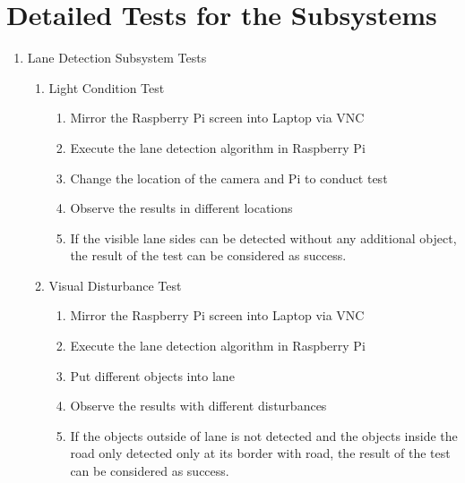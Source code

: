 \documentclass[a4paper,12pt]{article}
\begin{document}
\section{Detailed Tests for the Subsystems}\label{test_sec}


\begin{enumerate}


\item {Lane Detection Subsystem Tests}	

\begin{enumerate}

\item{Light Condition Test}

\begin{enumerate}

\item Mirror the Raspberry Pi screen into Laptop via VNC  

\item Execute the lane detection algorithm in Raspberry Pi 

\item Change the location of the camera and Pi to conduct test 

\item Observe the results in different locations   

\item If the visible lane sides can be detected without any additional object, the result of the test can be considered as success. 

\end{enumerate}

\item{Visual Disturbance Test}

\begin{enumerate}

\item Mirror the Raspberry Pi screen into Laptop via VNC   

\item Execute the lane detection algorithm in Raspberry Pi  

\item Put different objects into lane  

\item Observe the results with different disturbances 

\item If the objects outside of lane is not detected and the objects inside the road only detected only at its border with road, the result of the test can be considered as success.  


\end{enumerate}
\end{enumerate}
\end{enumerate}
\end{document}
